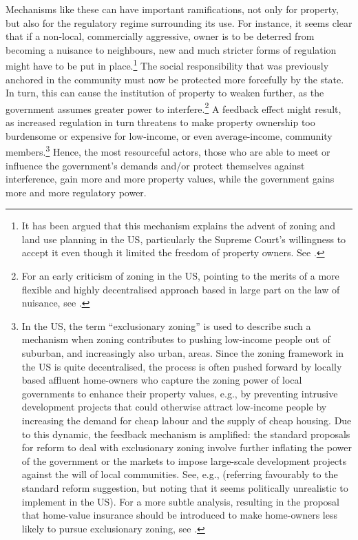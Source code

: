
Mechanisms like these can have important ramifications, not only for property, but also for the regulatory regime surrounding its use. For instance, it seems clear that if a non-local, commercially aggressive, owner is to be deterred from becoming a nuisance to neighbours, new and much stricter forms of regulation might have to be put in place.\footnote{It has been argued that this mechanism explains the advent of zoning and land use planning in the US, particularly the Supreme Court's willingness to accept it even though it limited the freedom of property owners. See \cite[99-100]{shoked01}.} The social responsibility that was previously anchored in the community must now be protected more forcefully by the state. In turn, this can cause the institution of property to weaken further, as the government assumes greater power to interfere.\footnote{For an early criticism of zoning in the US, pointing to the merits of a more flexible and highly decentralised approach based in large part on the law of nuisance, see \cite{ellickson73}.} A feedback effect might result, as increased regulation in turn threatens to make property ownership too burdensome or expensive for low-income, or even average-income, community members.\footnote{In the US, the term ``exclusionary zoning'' is used to describe such a mechanism when zoning contributes to pushing low-income people out of suburban, and increasingly also urban, areas. Since the zoning framework in the US is quite decentralised, the process is often pushed forward by locally based affluent home-owners who capture the zoning power of local governments to enhance their property values, e.g., by preventing intrusive development projects that could otherwise attract low-income people by increasing the demand for cheap labour and the supply of cheap housing. Due to this dynamic, the feedback mechanism is amplified: the standard proposals for reform to deal with exclusionary zoning involve further inflating the power of the government or the markets to impose large-scale development projects against the will of local communities. See, e.g., \cite[117-120]{manging14} (referring favourably to the standard reform suggestion, but noting that it seems politically unrealistic to implement in the US). For a more subtle analysis, resulting in the proposal that home-value insurance should be introduced to make home-owners less likely to pursue exclusionary zoning, see \cite{fischel05}.} Hence, the most resourceful actors, those who are able to meet or influence the government's demands and/or protect themselves against interference, gain more and more property values, while the government gains more and more regulatory power.

